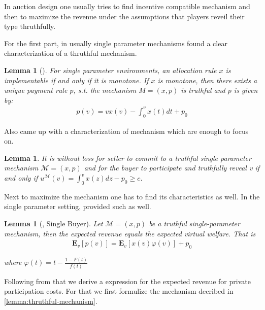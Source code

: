 \documentclass[11pt,a4paper]{article}
\newtheorem{lemma}[theorem]{Lemma}
\begin{document}
\begin{section}{}
 In auction design one usually tries to find incentive compatible mechanism and then to maximize the revenue under the assumptions that players reveil their type thruthfully.

 For the first part, in usually single parameter mechanisms \cite{myerson} found a clear characterization of a thruthful mechanism.

 \begin{lemma}[\cite{myerson}]
     For single parameter environments, an allocation rule $x$ is implementable if and only if it is monotone.
     If $x$ is monotone, then there exists a unique payment rule $p$, s.t. the mechanism $M=(x,p)$ is truthful
     and $p$ is given by:
     \begin{align*}
         p(v) = v x(v) - \int_0^v x(t) dt + p_0
     \end{align*}
 \end{lemma}

 Also \cite{primary} came up with a characterization of mechanism which are enough to focus on.

 \begin{lemma}{\cite{primary}}
     \label{lemma:thruthful-mechanism}
     It is without loss for seller to commit to a truthful single parameter mechanism $\mathcal{M}=(x,p)$ and
     for the buyer to participate and truthfully reveal v if and only if $u^\mathcal{M}(v) = \int_0^v x(z)dz - p_0 \geq c$.
 \end{lemma}

 Next to maximize the mechanism one has to find its characteristics as well.
 In the single parameter setting, \cite{myerson} provided such as well.

 \begin{lemma}[\cite{myerson}, Single Buyer]
     Let $\mathcal{M}=(x,p)$ be a truthful single-parameter mechanism, then the expected revenue equals the expected virtual welfare. That is
     \begin{align*}
         \mathbf{E}_v\left[p(v)\right]
         = \mathbf{E}_v\left[x(v)\varphi(v)\right] + p_0
     \end{align*}

     where $\varphi(t) = t - \frac{1 - F(t)}{f(t)}$
 \end{lemma}

 Following from that we derive a expression for the expected revenue for private participation costs.
 For that we first formulize the mechanism decribed in \autoref{lemma:thruthful-mechanism}.


\end{section}
\end{document}
